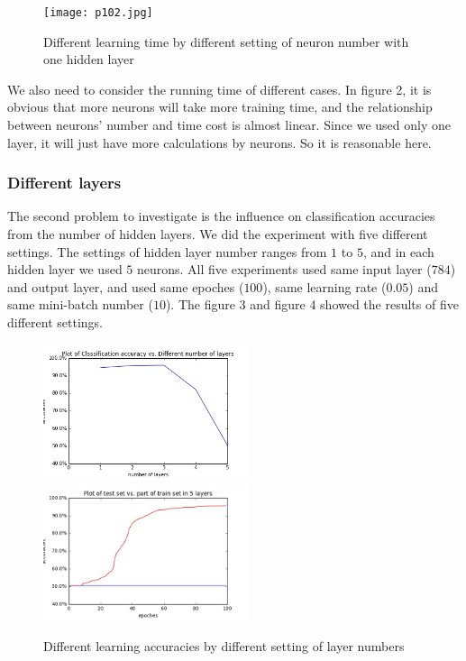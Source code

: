 \documentclass[12pt,a4paper]{article}
\begin{document}
\begin{figure}
\centering
\texttt{[image: p102.jpg]}\\
\caption{Different learning time by different setting of neuron number with one hidden layer}
\end{figure}

We also need to consider the running time of different cases. In figure 2, it is obvious that more neurons will take more training time, and the relationship between neurons' number and time cost is almost linear. Since we used only one layer, it will just have more calculations by neurons. So it is reasonable here.\\
\subsubsection{Different layers}
The second problem to investigate is the influence on classification accuracies from the number of hidden layers. We did the experiment with five different settings. The settings of hidden layer number ranges from $1$ to $5$, and in each hidden layer we used $5$ neurons. All five experiments used same input layer ($784$) and output layer, and used same epoches ($100$), same learning rate ($0.05$) and same mini-batch number ($10$). The figure 3 and figure 4 showed the results of five different settings.\\
\begin{figure}
\centering
\includegraphics[width=60mm,scale=1]{p103.jpg}
\includegraphics[width=60mm,scale=1]{p107.jpg}
\caption{Different learning accuracies by different setting of layer numbers}
\end{figure}
\end{document}
